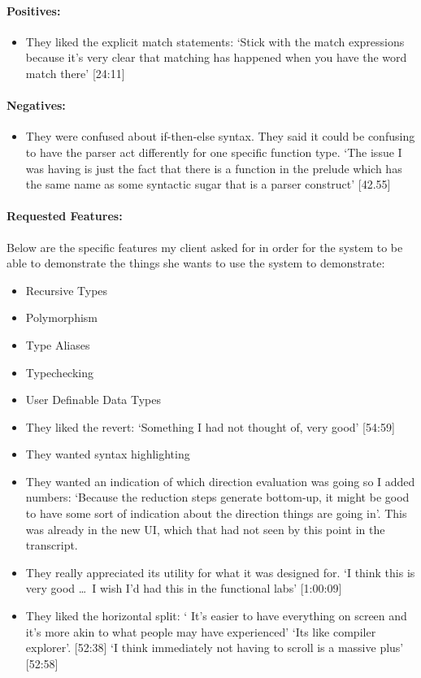 \paragraph{Positives:}
\begin{itemize}
    \item They liked the explicit match statements: `Stick with the match expressions because it's very clear that matching has happened when you have the word match there' [24:11]
\end{itemize}

\paragraph{Negatives:}
\begin{itemize}
    \item \label{ref:afg_ite} They were confused about if-then-else syntax. They said it could be confusing to have the parser act differently for one specific function type. `The issue I was having is just the fact that there is a function in the prelude which has the same name as some syntactic sugar that is a parser construct' [42.55]
\end{itemize}

\paragraph{Requested Features:}
Below are the specific features my client asked for in order for the system to be able to demonstrate the things she wants to use the system to demonstrate:
\begin{itemize}
    \item Recursive Types
    \item Polymorphism
    \item Type Aliases
    \item Typechecking
    \item User Definable Data Types
\end{itemize}

\begin{itemize}
    \item They liked the revert: `Something I had not thought of, very good' [54:59]
    \item They wanted syntax highlighting
    \item They wanted an indication of which direction evaluation was going so I added numbers: `Because the reduction steps generate bottom-up, it might be good to have some sort of indication about the direction things are going in'. This was already in the new UI, which that had not seen by this point in the transcript.
    \item They really appreciated its utility for what it was designed for. `I think this is very good \ldots\ I wish I'd had this in the functional labs' [1:00:09]
\end{itemize}

\begin{itemize}
    \item They liked the horizontal split: ` It's easier to have everything on screen and it's more akin to what people may have experienced' `Its like compiler explorer'. [52:38] `I think immediately not having to scroll is a massive plus' [52:58]
\end{itemize}